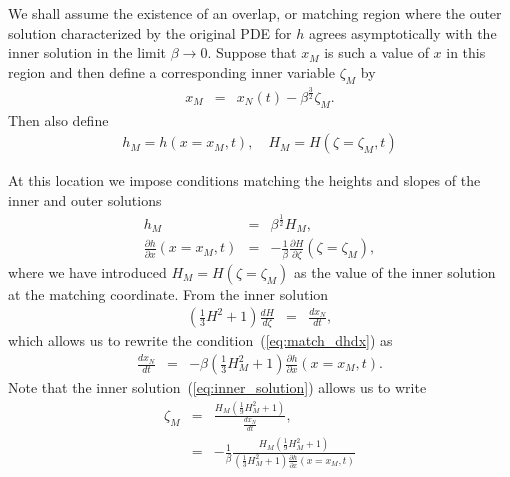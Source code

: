 \documentclass[11pt]{article}
\newcommand{\bea}{\begin{eqnarray}}
\newcommand{\eea}{\end{eqnarray}}
\begin{document}
We shall assume the existence of an overlap, or matching region where the outer solution characterized by the original PDE for $h$ agrees
asymptotically with the inner solution in the limit $\beta \rightarrow 0$.    Suppose that $x_M$ is such a value of $x$ in this region and then define
a corresponding inner variable $\zeta_M$ by 
\bea
x_M & = & x_N(t) - \beta^{\frac{3}{2}} \zeta_M.
\eea
Then also define
\bea
h_M = h(x=x_M,t),\quad
H_M = H(\zeta=\zeta_M,t)
\eea

At this location we impose conditions matching the heights and slopes of the inner and outer solutions
\bea
\label{eq:match_h}
h_M & = & \beta^{\frac{1}{2}} H_M,\\
\label{eq:match_dhdx}
\frac{\partial h}{\partial x}(x=x_M,t) & = & -\frac{1}{\beta} \frac{\partial H}{\partial \zeta}(\zeta = \zeta_M),
\eea
where we have introduced $H_M = H(\zeta= \zeta_M)$ as the value of the inner solution at the matching coordinate.  
From the inner solution 
\bea
\left( \frac{1}{3} H^2 + 1 \right) \frac{dH}{d\zeta} & = & \frac{dx_N}{dt},
\eea
which allows us to rewrite the condition~(\ref{eq:match_dhdx}) as
\bea
\frac{dx_N}{dt} & = & - \beta \left( \frac{1}{3} H_M^2 + 1 \right) \frac{\partial h}{\partial x}(x=x_M,t).
\eea
Note that the inner solution~(\ref{eq:inner_solution}) allows us to write
\bea
\zeta_M & = & \frac{H_M \left( \frac{1}{9} H_M^2 + 1 \right) }{\frac{dx_N}{dt}},\nonumber \\
 & = & - \frac{1}{\beta} \frac{H_M \left( \frac{1}{9} H_M^2 + 1 \right) }{ \left( \frac{1}{3} H_M^2 + 1 \right) \frac{\partial h}{\partial x}(x=x_M,t) } 
\eea
\end{document}
